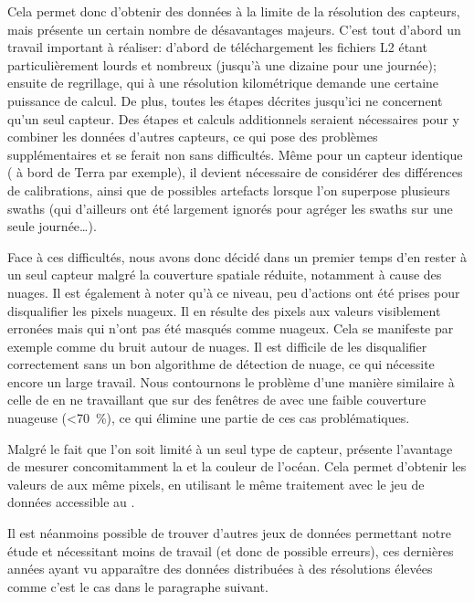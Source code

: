 \documentclass[index]{subfiles}
\begin{document}
Cela permet donc d'obtenir des données à la limite de la résolution des capteurs, mais présente un certain nombre de désavantages majeurs.
C'est tout d'abord un travail important à réaliser: d'abord de téléchargement les fichiers L2 étant particulièrement lourds et nombreux (jusqu'à une dizaine pour une journée); ensuite de regrillage, qui à une résolution kilométrique demande une certaine puissance de calcul.
De plus, toutes les étapes décrites jusqu'ici ne concernent qu'un seul capteur.
Des étapes et calculs additionnels seraient nécessaires pour y combiner les données d'autres capteurs, ce qui pose des problèmes supplémentaires et se ferait non sans difficultés.
Même pour un capteur identique ( à bord de Terra par exemple), il devient nécessaire de considérer des différences de calibrations, ainsi que de possibles artefacts lorsque l'on superpose plusieurs swaths (qui d'ailleurs ont été largement ignorés pour agréger les swaths sur une seule journée\dots).

Face à ces difficultés, nous avons donc décidé dans un premier temps d'en rester à un seul capteur malgré la couverture spatiale réduite, notamment à cause des nuages.
Il est également à noter qu'à ce niveau, peu d'actions ont été prises pour disqualifier les pixels nuageux.
Il en résulte des pixels aux valeurs visiblement erronées mais qui n'ont pas été masqués comme nuageux.
Cela se manifeste par exemple comme du bruit autour de nuages.
Il est difficile de les disqualifier correctement sans un bon algorithme de détection de nuage, ce qui nécessite encore un large travail.
Nous contournons le problème d'une manière similaire à celle de \textcite{liu_2016} en ne travaillant que sur des fenêtres de  avec une faible couverture nuageuse (\textless\qty{70}{\percent}), ce qui élimine une partie de ces cas problématiques.

Malgré le fait que l'on soit limité à un seul type de capteur,  présente l'avantage de mesurer concomitamment la  et la couleur de l'océan.
Cela permet d'obtenir les valeurs de  aux même pixels, en utilisant le même traitement avec le jeu de données accessible au  \parencite{chl_modis}.

Il est néanmoins possible de trouver d'autres jeux de données permettant notre étude et nécessitant moins de travail (et donc de possible erreurs), ces dernières années ayant vu apparaître des données distribuées à des résolutions élevées comme c'est le cas dans le paragraphe suivant.
\end{document}
